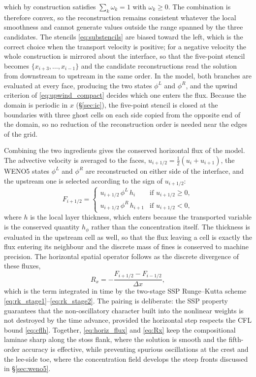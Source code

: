 \documentclass[lineno]{JFM-FLM_Au}
\begin{document}
which by construction satisfies $\sum_k \omega_k = 1$ with $\omega_k \geq 0$. The combination is therefore convex, so the reconstruction remains consistent whatever the local smoothness and cannot generate values outside the range spanned by the three candidates. The stencils \eqref{eq:substencils} are biased toward the left, which is the correct choice when the transport velocity is positive; for a negative velocity the whole construction is mirrored about the interface, so that the five-point stencil becomes $\{x_{i+3},\dots,x_{i-1}\}$ and the candidate reconstructions read the solution from downstream to upstream in the same order. In the model, both branches are evaluated at every face, producing the two states $\phi^{L}$ and $\phi^{R}$, and the upwind criterion of \eqref{eq:upwind_compact} decides which one enters the flux. Because the domain is periodic in $x$ (\S\ref{sec:ic}), the five-point stencil is closed at the boundaries with three ghost cells on each side copied from the opposite end of the domain, so no reduction of the reconstruction order is needed near the edges of the grid.

Combining the two ingredients gives the conserved horizontal flux of the model. The advective velocity is averaged to the faces, $u_{i+1/2}=\tfrac{1}{2}(u_i+u_{i+1})$, the WENO5 states $\phi^{L}$ and $\phi^{R}$ are reconstructed on either side of the interface, and the upstream one is selected according to the sign of $u_{i+1/2}$:
\begin{equation}
    F_{i+1/2} =
    \begin{cases}
        u_{i+1/2}\, \phi^L\, h_i & \text{if } u_{i+1/2} \geq 0, \\
        u_{i+1/2}\, \phi^R\, h_{i+1} & \text{if } u_{i+1/2} < 0,
    \end{cases}
    \label{eq:horiz_flux}
\end{equation}
where $h$ is the local layer thickness, which enters because the transported variable is the conserved quantity $h_\phi$ rather than the concentration itself. The thickness is evaluated in the upstream cell as well, so that the flux leaving a cell is exactly the flux entering its neighbour and the discrete mass of fines is conserved to machine precision. The horizontal spatial operator follows as the discrete divergence of these fluxes,
\begin{equation}
    R_x = -\frac{F_{i+1/2}-F_{i-1/2}}{\Delta x},
    \label{eq:Rx}
\end{equation}
which is the term integrated in time by the two-stage SSP Runge--Kutta scheme \eqref{eq:rk_stage1}--\eqref{eq:rk_stage2}. The pairing is deliberate: the SSP property guarantees that the non-oscillatory character built into the nonlinear weights is not destroyed by the time advance, provided the horizontal step respects the CFL bound \eqref{eq:cflh}. Together, \eqref{eq:horiz_flux} and \eqref{eq:Rx} keep the compositional laminae sharp along the stoss flank, where the solution is smooth and the fifth-order accuracy is effective, while preventing spurious oscillations at the crest and the lee-side toe, where the concentration field develops the steep fronts discussed in \S\ref{sec:weno5}.

\newpage





\end{document}
